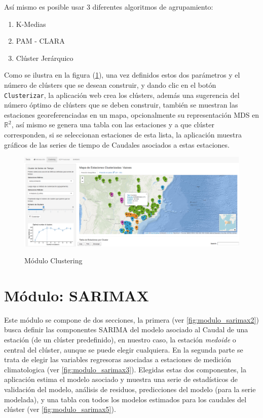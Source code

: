 \documentclass[12pt,oneside]{book}\usepackage[]{graphicx}\usepackage[]{color}
\theoremstyle{definition} %
\begin{document}
Así mismo es posible usar 3 diferentes algoritmos de agrupamiento:

\begin{enumerate}
\item K-Medias
\item PAM - CLARA
\item Clúster Jerárquico
\end{enumerate}

Como se ilustra  en la figura (\ref{fig:app_clustering}), una vez definidos estos dos parámetros y el número de clústers que se desean construir, y dando clic en el botón \texttt{Clusterizar}, la aplicación web crea los clústers, además una sugerencia del número óptimo de clústers que se deben construir, también se muestran las estaciones georeferenciadas en un mapa, opcionalmente su representación MDS en $\mathbb{R}^2$, así mismo se genera una tabla con las estaciones y a que clúster corresponden, si se seleccionan estaciones de esta lista, la aplicación muestra gráficos de las series de tiempo de Caudales asociados a estas estaciones. 


\begin{figure}[h]
\caption{Módulo Clustering}
\includegraphics[width=15cm]{Cap3-WebApp/modulo_clustering}
\label{fig:app_clustering}
\centering
\end{figure}


\section{Módulo: SARIMAX}

Este módulo se compone de dos secciones, la primera (ver \ref{fig:modulo_sarimax2}) busca definir las componentes SARIMA del modelo asociado al Caudal de una estación (de un clúster predefinido), en nuestro caso, la estación \textit{medoide} o central del clúster, aunque se puede elegir cualquiera. En la segunda parte se trata de elegir las variables regresoras asociadas a estaciones de medición climatologica (ver \ref{fig:modulo_sarimax3}). Elegidas estas dos componentes, la aplicación estima el modelo asociado y muestra una serie de estadísticos de validación del modelo, análisis de residuos, predicciones del modelo (para la serie modelada), y una tabla con todos los modelos estimados para los caudales del clúster (ver \ref{fig:modulo_sarimax5}).
\end{document}
